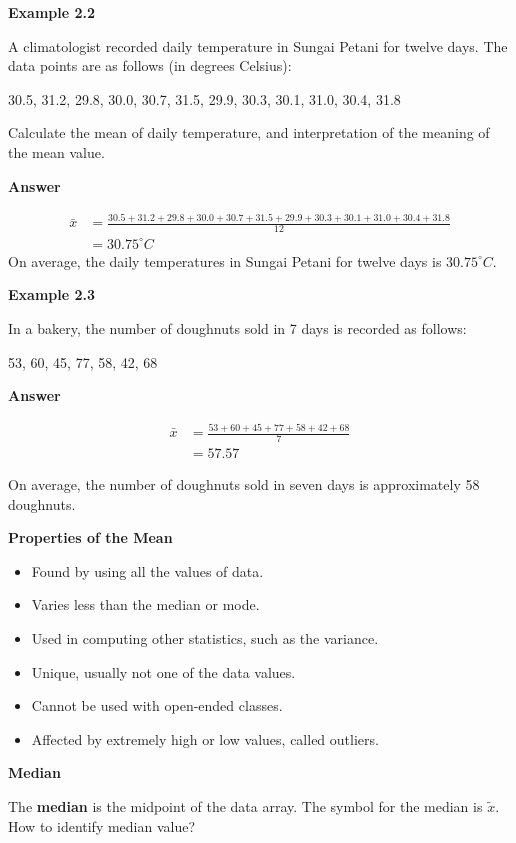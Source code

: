 \documentclass[
  a4paper,
  DIV=11,
  numbers=noendperiod,
  oneside]{scrreprt}
\providecommand{\tightlist}{%
  \setlength{\itemsep}{0pt}\setlength{\parskip}{0pt}}\usepackage{longtable,booktabs,array}
\begin{document}
{\textbf{Example 2.2}}

A climatologist recorded daily temperature in Sungai Petani for twelve
days. The data points are as follows (in degrees Celsius):

30.5, 31.2, 29.8, 30.0, 30.7, 31.5, 29.9, 30.3, 30.1, 31.0, 30.4, 31.8

Calculate the mean of daily temperature, and interpretation of the
meaning of the mean value.

{\textbf{Answer}}

\[
\begin{aligned}
\bar{x} &= \frac{30.5+31.2+29.8+30.0+30.7+31.5+29.9+30.3+30.1+31.0+30.4+31.8}{12} \\
&= 30.75^\circ C
\end{aligned}
\] On average, the daily temperatures in Sungai Petani for twelve days
is \(30.75^\circ C\).

{\textbf{Example 2.3}}

In a bakery, the number of doughnuts sold in 7 days is recorded as
follows:

53, 60, 45, 77, 58, 42, 68

{\textbf{Answer}}

\[
\begin{aligned}
\bar{x} &= \frac{53 + 60 + 45 + 77 + 58 + 42 + 68}{7} \\
&= 57.57
\end{aligned}
\]

On average, the number of doughnuts sold in seven days is approximately
58 doughnuts.

\textbf{Properties of the Mean}

\begin{itemize}
\tightlist
\item
  Found by using all the values of data.
\item
  Varies less than the median or mode.
\item
  Used in computing other statistics, such as the variance.
\item
  Unique, usually not one of the data values.
\item
  Cannot be used with open-ended classes.
\item
  Affected by extremely high or low values, called outliers.
\end{itemize}

\textbf{Median}

The \textbf{median} is the midpoint of the data array. The symbol for
the median is \(\tilde{x}\). How to identify median value?
\end{document}
